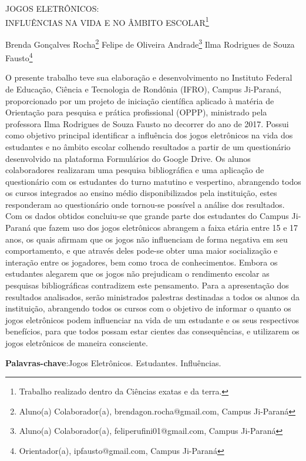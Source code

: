 \documentclass[article,12pt,onesidea,4paper,english,brazil]{abntex2}
\begin{document}
	
	
	\frenchspacing 
	
	\begin{center}
		\LARGE JOGOS ELETRÔNICOS: \\INFLUÊNCIAS NA VIDA E NO ÂMBITO ESCOLAR\footnote{Trabalho realizado dentro da Ciências exatas e da terra.}
		
		\normalsize
		Brenda Gonçalves Rocha\footnote{Aluno(a) Colaborador(a), brendagon.rocha@gmail.com, Campus Ji-Paraná} 
		Felipe de Oliveira Andrade\footnote{Aluno(a) Colaborador(a), feliperufini01@gmail.com, Campus Ji-Paraná} 
	    Ilma Rodrigues de Souza Fausto\footnote{Orientador(a), ipfausto@gmail.com, Campus Ji-Paraná} 
		 
	\end{center}
	
	\noindent O presente trabalho teve sua elaboração e desenvolvimento no Instituto Federal de
	Educação, Ciência e Tecnologia de Rondônia (IFRO), Campus Ji-Paraná,
	proporcionado por um projeto de iniciação científica aplicado à matéria de Orientação
	para pesquisa e prática profissional (OPPP), ministrado pela professora Ilma
	Rodrigues de Souza Fausto no decorrer do ano de 2017. Possui como objetivo
	principal identificar a influência dos jogos eletrônicos na vida dos estudantes e no
	âmbito escolar colhendo resultados a partir de um questionário desenvolvido na
	plataforma Formulários do Google Drive. Os alunos colaboradores realizaram uma
	pesquisa bibliográfica e uma aplicação de questionário com os estudantes do turno
	matutino e vespertino, abrangendo todos os cursos integrados ao ensino médio
	disponibilizados pela instituição, estes responderam ao questionário onde tornou-se
	possível a análise dos resultados. Com os dados obtidos concluiu-se que grande parte
	dos estudantes do Campus Ji-Paraná que fazem uso dos jogos eletrônicos abrangem
	a faixa etária entre 15 e 17 anos, os quais afirmam que os jogos não influenciam de
	forma negativa em seu comportamento, e que através deles pode-se obter uma maior
	socialização e interação entre os jogadores, bem como troca de conhecimentos.
	Embora os estudantes alegarem que os jogos não prejudicam o rendimento escolar
	as pesquisas bibliográficas contradizem este pensamento. Para a apresentação dos
	resultados analisados, serão ministrados palestras destinadas a todos os alunos da
	instituição, abrangendo todos os cursos com o objetivo de informar o quanto os jogos
	eletrônicos podem influenciar na vida de um estudante e os seus respectivos
	benefícios, para que todos possam estar cientes das consequências, e utilizarem os
	jogos eletrônicos de maneira consciente.
	
	\vspace{\onelineskip}
	
	\noindent
	\textbf{Palavras-chave}:Jogos Eletrônicos. Estudantes. Influências.
	
\end{document}
